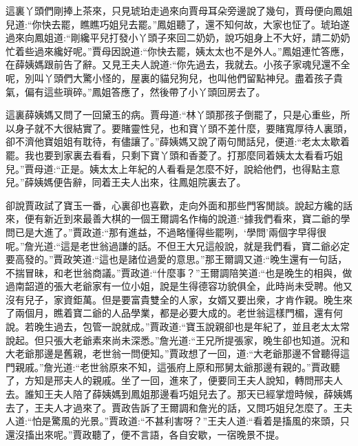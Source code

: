 \begin{parag}
    這裏丫頭們剛捧上茶來，只見琥珀走過來向賈母耳朵旁邊說了幾句，賈母便向鳳姐兒道:“你快去罷，瞧瞧巧姐兒去罷。”鳳姐聽了，還不知何故，大家也怔了。琥珀遂過來向鳳姐道:“剛纔平兒打發小丫頭子來回二奶奶，說巧姐身上不大好，請二奶奶忙着些過來纔好呢。”賈母因說道:“你快去罷，姨太太也不是外人。”鳳姐連忙答應，在薛姨媽跟前告了辭。又見王夫人說道:“你先過去，我就去。小孩子家魂兒還不全呢，別叫丫頭們大驚小怪的，屋裏的貓兒狗兒，也叫他們留點神兒。盡着孩子貴氣，偏有這些瑣碎。”鳳姐答應了，然後帶了小丫頭回房去了。
\end{parag}


\begin{parag}
    這裏薛姨媽又問了一回黛玉的病。賈母道:“林丫頭那孩子倒罷了，只是心重些，所以身子就不大很結實了。要賭靈性兒，也和寶丫頭不差什麼，要賭寬厚待人裏頭，卻不濟他寶姐姐有耽待，有儘讓了。”薛姨媽又說了兩句閒話兒，便道:“老太太歇着罷。我也要到家裏去看看，只剩下寶丫頭和香菱了。打那麼同着姨太太看看巧姐兒。”賈母道:“正是。姨太太上年紀的人看看是怎麼不好，說給他們，也得點主意兒。”薛姨媽便告辭，同着王夫人出來，往鳳姐院裏去了。
\end{parag}


\begin{parag}
    卻說賈政試了寶玉一番，心裏卻也喜歡，走向外面和那些門客閒談。說起方纔的話來，便有新近到來最善大棋的一個王爾調名作梅的說道:“據我們看來，寶二爺的學問已是大進了。”賈政道:“那有進益，不過略懂得些罷咧，‘學問’兩個字早得很呢。”詹光道:“這是老世翁過謙的話。不但王大兄這般說，就是我們看，寶二爺必定要高發的。”賈政笑道:“這也是諸位過愛的意思。”那王爾調又道:“晚生還有一句話，不揣冒昧，和老世翁商議。”賈政道:“什麼事？”王爾調陪笑道:“也是晚生的相與，做過南韶道的張大老爺家有一位小姐，說是生得德容功貌俱全，此時尚未受聘。他又沒有兒子，家資鉅萬。但是要富貴雙全的人家，女婿又要出衆，才肯作親。晚生來了兩個月，瞧着寶二爺的人品學業，都是必要大成的。老世翁這樣門楣，還有何說。若晚生過去，包管一說就成。”賈政道:“寶玉說親卻也是年紀了，並且老太太常說起。但只張大老爺素來尚未深悉。”詹光道:“王兄所提張家，晚生卻也知道。況和大老爺那邊是舊親，老世翁一問便知。”賈政想了一回，道:“大老爺那邊不曾聽得這門親戚。”詹光道:“老世翁原來不知，這張府上原和邢舅太爺那邊有親的。”賈政聽了，方知是邢夫人的親戚。坐了一回，進來了，便要同王夫人說知，轉問邢夫人去。誰知王夫人陪了薛姨媽到鳳姐那邊看巧姐兒去了。那天已經掌燈時候，薛姨媽去了，王夫人才過來了。賈政告訴了王爾調和詹光的話，又問巧姐兒怎麼了。王夫人道:“怕是驚風的光景。”賈政道:“不甚利害呀？”王夫人道:“看着是搐風的來頭，只還沒搐出來呢。”賈政聽了，便不言語，各自安歇，一宿晚景不提。
\end{parag}


